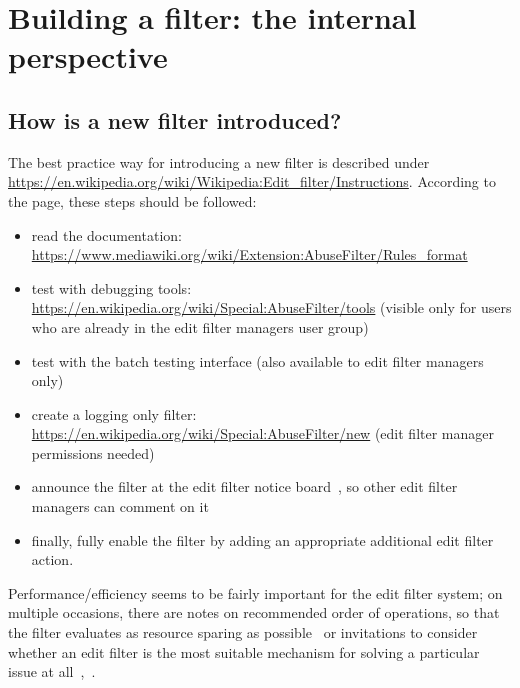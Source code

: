 
\section{Building a filter: the internal perspective}
\subsection{How is a new filter introduced?}

The best practice way for introducing a new filter is described under \url{https://en.wikipedia.org/wiki/Wikipedia:Edit_filter/Instructions}.
According to the page, these steps should be followed:
\begin{itemize}
    \item read the documentation: \url{https://www.mediawiki.org/wiki/Extension:AbuseFilter/Rules_format}
    \item test with debugging tools: \url{https://en.wikipedia.org/wiki/Special:AbuseFilter/tools} (visible only for users who are already in the edit filter managers user group)
    \item test with the batch testing interface (also available to edit filter managers only)
    \item create a logging only filter: \url{https://en.wikipedia.org/wiki/Special:AbuseFilter/new} (edit filter manager permissions needed)
    \item announce the filter at the edit filter notice board~\cite{Wikipedia:EditFilterNoticeboard}, so other edit filter managers can comment on it
    \item finally, fully enable the filter by adding an appropriate additional edit filter action.
\end{itemize}

Performance/efficiency seems to be fairly important for the edit filter system;
on multiple occasions, there are notes on recommended order of operations, so that the filter evaluates as resource sparing as possible~\cite{Wikipedia:EditFilterInstructions} or invitations to consider whether an edit filter is the most suitable mechanism for solving a particular issue at all~\cite{Wikipedia:EditFilter},~\cite{Wikipedia:EditFilterRequested}.

